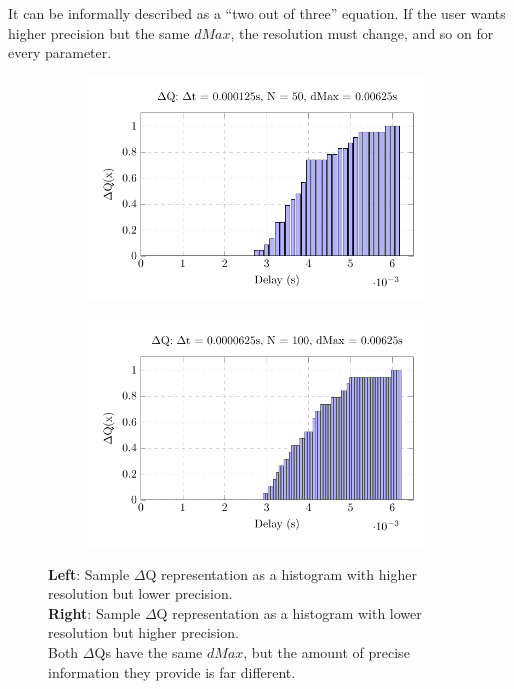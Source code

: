     It can be informally described as a ``two out of three'' equation. If the user wants higher precision but the same $dMax$, the resolution must change, and so on for every parameter.
        \begin{figure}[H]
            \centering
            \begin{subfigure}{.5\textwidth}
                \centering
                \includegraphics[width =0.98\textwidth]{tikz/hist_50.pdf}
                \label{fig:hist_50}
            \end{subfigure}%
            \begin{subfigure}{.5\textwidth}%
                \centering%
                \includegraphics[width =0.98\textwidth]{tikz/hist_100.pdf}%
                \label{fig:hist_100}%
            \end{subfigure}%
            \label{fig:hist_dmax}%
            \caption{\textbf{Left}: Sample $\Delta$Q representation as a histogram with higher resolution but lower precision. \\
            \textbf{Right}: Sample $\Delta$Q representation as a histogram with lower resolution but higher precision. \\
            Both $\Delta$Qs have the same $dMax$, but the amount of precise information they provide is far different.}
        \end{figure}%

